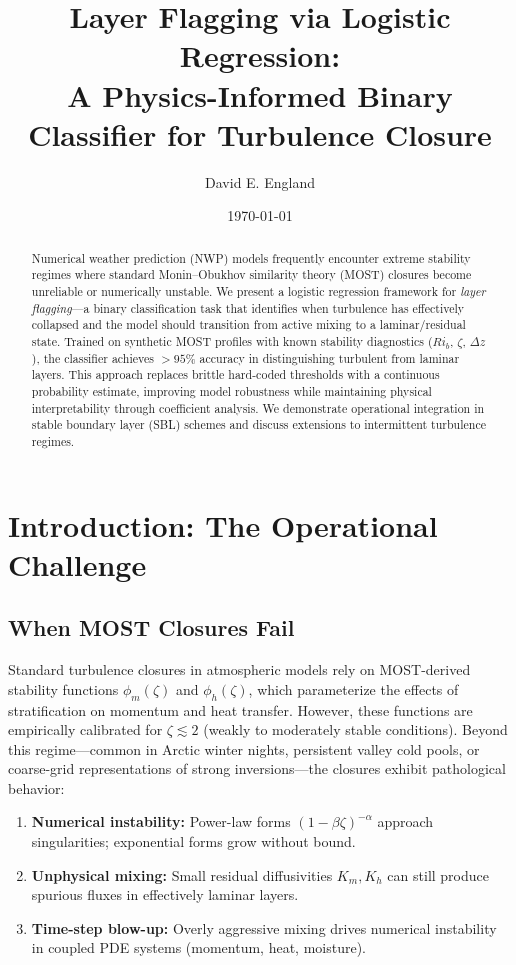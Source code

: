 \documentclass[11pt]{article}
\title{Layer Flagging via Logistic Regression:\\A Physics-Informed Binary Classifier for Turbulence Closure}
\author{David E. England}
\date{\today}
\begin{document}
\maketitle

\begin{abstract}
Numerical weather prediction (NWP) models frequently encounter extreme stability regimes where standard Monin--Obukhov similarity theory (MOST) closures become unreliable or numerically unstable. We present a logistic regression framework for \emph{layer flagging}---a binary classification task that identifies when turbulence has effectively collapsed and the model should transition from active mixing to a laminar/residual state. Trained on synthetic MOST profiles with known stability diagnostics ($Ri_b$, $\zeta$, $\Delta z$), the classifier achieves $>95\%$ accuracy in distinguishing turbulent from laminar layers. This approach replaces brittle hard-coded thresholds with a continuous probability estimate, improving model robustness while maintaining physical interpretability through coefficient analysis. We demonstrate operational integration in stable boundary layer (SBL) schemes and discuss extensions to intermittent turbulence regimes.
\end{abstract}

\section{Introduction: The Operational Challenge}

\subsection{When MOST Closures Fail}

Standard turbulence closures in atmospheric models rely on MOST-derived stability functions $\phi_m(\zeta)$ and $\phi_h(\zeta)$, which parameterize the effects of stratification on momentum and heat transfer. However, these functions are empirically calibrated for $\zeta \lesssim 2$ (weakly to moderately stable conditions). Beyond this regime---common in Arctic winter nights, persistent valley cold pools, or coarse-grid representations of strong inversions---the closures exhibit pathological behavior:

\begin{enumerate}[leftmargin=*]
\item \textbf{Numerical instability:} Power-law forms $(1-\beta\zeta)^{-\alpha}$ approach singularities; exponential forms grow without bound.
\item \textbf{Unphysical mixing:} Small residual diffusivities $K_m, K_h$ can still produce spurious fluxes in effectively laminar layers.
\item \textbf{Time-step blow-up:} Overly aggressive mixing drives numerical instability in coupled PDE systems (momentum, heat, moisture).
\end{enumerate}
\end{document}
